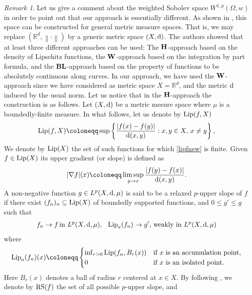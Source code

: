 \documentclass[11pt,leqno]{amsart}
\theoremstyle{remark}
\newtheorem{oss}[teo]{Remark}
\theoremstyle{definition}
\theoremstyle{definition}
\newcommand{\norma}[1]{{\left\| #1\right\|}}
\begin{document}
\begin{oss}
Let us give a comment about the weighted Sobolev space $W^{1,p}(\Omega,w)$  in order to point out that our approach is essentially different. As shown in \cite{LAMB0}, this space can be constructed for general metric measure spaces. That is, we may replace $(\mathbb{R}^{d}, \norma{\cdot})$ by a generic metric space $(X,{\rm d})$. The authors showed that at least three different approaches can be used: The ${\bf H}$-approach based on the density of Lipschitz functions, the ${\bf W}$-approach based on the integration by part formula, and the ${ \bf BL}$-approach based on the property of functions to be absolutely continuous along curves. In our approach, we have used the ${ {\bf W}}$-approach since we have considered as metric space $X=\mathbb{R}^{d}$, and the metric ${\rm d}$ induced by the usual norm. Let us notice that in the ${\bf H}$-approach the construction is as follows. Let $(X,{\rm d})$ be a metric mesure space where $\mu$ is a boundedly-finite measure.  In what follows, let us denote by ${\rm Lip}(f,X)$ 
\begin{align}\label{lipfnew}
{\rm Lip}(f,X)\coloneqq \sup\left\{\frac{\vert f(x)-f(y)\vert}{{\rm d}(x,y)}: x,y\in X,\, x\neq y\right\},
\end{align}
 We denote by ${\rm Lip}(X)$ the set of such functions for which \eqref{lipfnew} is finite.  Given $f\in {\rm Lip}(X)$ its upper gradient (or slope) is defined as 
\begin{align*}
\vert \nabla f\vert(x)\coloneqq \limsup_{y\rightarrow x}\frac{\vert f(y)-f(x)\vert}{{\rm d}(x,y)}.
\end{align*}
A non-negative function $g\in L^{p}(X,{\rm d},\mu)$ is said to be a relaxed $p$-upper slope of $f$ if there exist $(f_{n})_{n}\subseteq {\rm Lip}(X)$ of boundedly supported functions, and $0\leq g'\leq g$ such that
\begin{align*}
f_{n}\rightarrow f\, \text{in $L^{p}(X,{\rm d},\mu)$},\,\hskip 0,2cm {\rm Lip}_{a}(f_{n})\rightarrow g',\, \text{weakly in $L^{p}(X,{\rm d},\mu)$}
\end{align*}
where 
\begin{align*}
{\rm Lip}_{a}(f_{n})(x)\coloneqq
\begin{cases}
\inf_{r>0}{\rm Lip}(f_{n},B_{r}(x))& \text{if $x$ is an accumulation point,}\\
0& \text{if $x$ is an isolated point.}
\end{cases}
\end{align*}
Here $B_{r}(x)$ denotes a ball of radius $r$ centered at $x\in X$. By following \cite{LAMB0}, we denote by ${\rm RS}(f)$ the set of all possible $p$-upper slope, and 

\end{oss}
\end{document}
